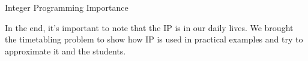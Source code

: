 \documentclass{beamer}
\begin{document}
\begin{frame}{Integer Programming Importance}

In the end, it's important to note that the IP is in our daily lives. We brought the timetabling problem to show how IP is used in practical examples and try to approximate it and the students.

\end{frame}

\end{document}
